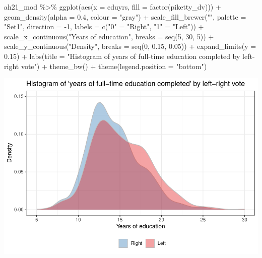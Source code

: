 \documentclass[
]{article}
\newenvironment{Shaded}{\begin{snugshade}}{\end{snugshade}}
\newcommand{\AttributeTok}[1]{\textcolor[rgb]{0.77,0.63,0.00}{#1}}
\newcommand{\DecValTok}[1]{\textcolor[rgb]{0.00,0.00,0.81}{#1}}
\newcommand{\FloatTok}[1]{\textcolor[rgb]{0.00,0.00,0.81}{#1}}
\newcommand{\FunctionTok}[1]{\textcolor[rgb]{0.00,0.00,0.00}{#1}}
\newcommand{\NormalTok}[1]{#1}
\newcommand{\OtherTok}[1]{\textcolor[rgb]{0.56,0.35,0.01}{#1}}
\newcommand{\SpecialCharTok}[1]{\textcolor[rgb]{0.00,0.00,0.00}{#1}}
\newcommand{\StringTok}[1]{\textcolor[rgb]{0.31,0.60,0.02}{#1}}
\begin{document}
\begin{Shaded}
\begin{Highlighting}[]
\NormalTok{ah21\_mod }\SpecialCharTok{\%\textgreater{}\%}
  \FunctionTok{ggplot}\NormalTok{(}\FunctionTok{aes}\NormalTok{(}\AttributeTok{x =}\NormalTok{ eduyrs, }\AttributeTok{fill =} \FunctionTok{factor}\NormalTok{(piketty\_dv))) }\SpecialCharTok{+}
  \FunctionTok{geom\_density}\NormalTok{(}\AttributeTok{alpha =} \FloatTok{0.4}\NormalTok{, }\AttributeTok{colour =} \StringTok{"gray"}\NormalTok{) }\SpecialCharTok{+}
  \FunctionTok{scale\_fill\_brewer}\NormalTok{(}\StringTok{""}\NormalTok{, }\AttributeTok{palette =} \StringTok{"Set1"}\NormalTok{, }\AttributeTok{direction =} \SpecialCharTok{{-}}\DecValTok{1}\NormalTok{, }
                      \AttributeTok{labels =} \FunctionTok{c}\NormalTok{(}\StringTok{"0"} \OtherTok{=} \StringTok{"Right"}\NormalTok{, }
                                 \StringTok{"1"} \OtherTok{=} \StringTok{"Left"}\NormalTok{)) }\SpecialCharTok{+}
  \FunctionTok{scale\_x\_continuous}\NormalTok{(}\StringTok{"Years of education"}\NormalTok{, }
                     \AttributeTok{breaks =} \FunctionTok{seq}\NormalTok{(}\DecValTok{5}\NormalTok{, }\DecValTok{30}\NormalTok{, }\DecValTok{5}\NormalTok{)) }\SpecialCharTok{+}
  \FunctionTok{scale\_y\_continuous}\NormalTok{(}\StringTok{"Density"}\NormalTok{, }
                     \AttributeTok{breaks =} \FunctionTok{seq}\NormalTok{(}\DecValTok{0}\NormalTok{, }\FloatTok{0.15}\NormalTok{, }\FloatTok{0.05}\NormalTok{)) }\SpecialCharTok{+}
  \FunctionTok{expand\_limits}\NormalTok{(}\AttributeTok{y =} \FloatTok{0.15}\NormalTok{) }\SpecialCharTok{+}
  \FunctionTok{labs}\NormalTok{(}\AttributeTok{title =} \StringTok{"Histogram of \textquotesingle{}years of full{-}time education completed\textquotesingle{} by left{-}right vote"}\NormalTok{) }\SpecialCharTok{+}
  \FunctionTok{theme\_bw}\NormalTok{() }\SpecialCharTok{+}
  \FunctionTok{theme}\NormalTok{(}\AttributeTok{legend.position =} \StringTok{"bottom"}\NormalTok{)}
\end{Highlighting}
\end{Shaded}

\begin{center}\includegraphics{AVCD-Assignment1-Edenhofer_files/figure-latex/edu-distribution-by-left-right-app-1} \end{center}
\end{document}
